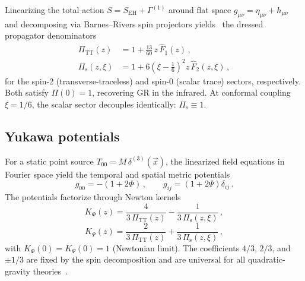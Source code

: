 \documentclass[aps,prd,twocolumn,superscriptaddress,nofootinbib,floatfix]{revtex4-2}
\newcommand{\PiTT}{\Pi_{\mathrm{TT}}}
\newcommand{\Pis}{\Pi_{\mathrm{s}}}
\begin{document}
Linearizing the total action
$S = S_{\mathrm{EH}} + \Gamma^{(1)}$ around flat space
$g_{\mu\nu} = \eta_{\mu\nu} + h_{\mu\nu}$ and decomposing via
Barnes--Rivers spin projectors yields~\cite{Stelle:1976gc,vanDam:1970vg}
the dressed propagator denominators
\begin{align}
  \PiTT(z) &= 1 + \frac{13}{60}\,z\,\hat{F}_1(z)\,,
  \label{eq:PiTT}\\
  \Pis(z,\xi) &= 1 + 6\!\left(\xi - \frac{1}{6}\right)^{\!2}
    z\,\hat{F}_2(z,\xi)\,,
  \label{eq:Pis}
\end{align}
for the spin-2 (transverse-traceless) and spin-0 (scalar trace) sectors,
respectively. Both satisfy $\Pi(0) = 1$, recovering GR in the infrared.
At conformal coupling $\xi = 1/6$, the scalar sector decouples
identically: $\Pis \equiv 1$.

\subsection{Yukawa potentials}

For a static point source $T_{00} = M\,\delta^{(3)}(\vec{x})$, the
linearized field equations in Fourier space yield the temporal and
spatial metric potentials
\begin{equation}
  g_{00} = -(1 + 2\Phi)\,,\qquad
  g_{ij} = (1 + 2\Psi)\delta_{ij}\,.
\end{equation}
The potentials factorize through Newton kernels
\begin{equation}
  K_\Phi(z) = \frac{4}{3\,\PiTT(z)}
    - \frac{1}{3\,\Pis(z,\xi)}\,,
  \label{eq:KPhi}
\end{equation}
\begin{equation}
  K_\Psi(z) = \frac{2}{3\,\PiTT(z)}
    + \frac{1}{3\,\Pis(z,\xi)}\,,
  \label{eq:KPsi}
\end{equation}
with $K_\Phi(0) = K_\Psi(0) = 1$ (Newtonian limit). The coefficients
$4/3$, $2/3$, and $\pm 1/3$ are fixed by the spin decomposition and are
universal for all quadratic-gravity
theories~\cite{Stelle:1976gc,Edholm:2016}.
\end{document}
